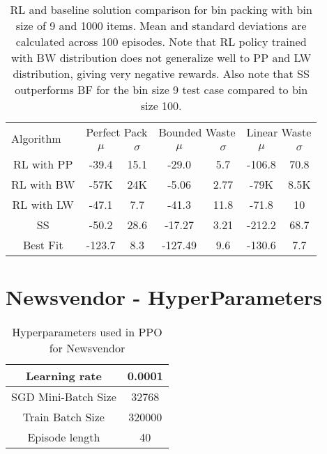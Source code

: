 \documentclass[letterpaper]{article} %
\begin{document}
\begin{table}[!htbp]
	\centering
	\begin{tabular}{|c|cc|cc|cc|}
		\hline
		\multicolumn{1}{|l|}{\multirow{2}{*}{Algorithm}}  & \multicolumn{2}{c|}{Perfect Pack} & \multicolumn{2}{c|}{Bounded Waste}	& \multicolumn{2}{c|}{Linear Waste} \\
		\multicolumn{1}{|l|}{} 											&   $\mu$            &        $\sigma$		& 	$\mu$    			& 	$\sigma$     		 &     $\mu$        &      $\sigma$          \\ \hline
		RL with PP  										  			   &  -39.4     		   &          15.1        	&  	-29.0 	  			  &   5.7	 				 &     -106.8       &      70.8     \\ \hline
		RL with BW  									  				  & -57K     		   &          24K        &  	-5.06 	  			  &   2.77	 				 &     -79K       &      8.5K     \\ \hline
		RL with LW 										 				  &  -47.1     		  &         7.7               &  	-41.3	  			&   11.8	 			   &     -71.8      &      10     \\ \hline
		SS  											   						&  -50.2     	    &         28.6           &    -17.27 	  			&   3.21	 			   &     -212.2      &      68.7     \\ \hline
		Best Fit  															  &  -123.7     	   &          8.3           &  	-127.49 	  			&   9.6	 			   &     -130.6     &      7.7     \\ \hline
	\end{tabular}
	\caption{RL and baseline solution comparison for bin packing with bin size of 9 and 1000 items. Mean and standard deviations are calculated across 100 episodes. Note that RL policy trained with BW distribution does not generalize well to PP and LW distribution, giving very negative rewards. Also note that SS outperforms BF for the bin size 9 test case compared to bin size 100.}
	\label{table:bin_size_9_RL_baseline_comp}
\end{table}

\section{Newsvendor - HyperParameters}
\label{appendix:newsvendor_hp}

\begin{table}[h!]
	\centering
	\begin{tabular}{ |c|c| }
		\hline
		Learning rate & 0.0001\\
		\hline
		SGD Mini-Batch Size & 32768\\
		\hline
		Train Batch Size & 320000\\
		\hline
		Episode length & 40\\
		\hline
		\hline
	\end{tabular}
	\caption{Hyperparameters used in PPO for Newsvendor}
	\label{table:newsvendor_hyperparam}
	\vspace{-1em}
\end{table}
\end{document}
